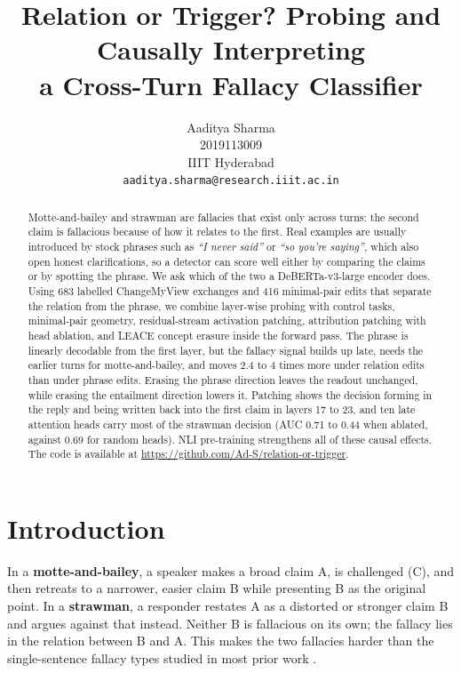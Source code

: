 \documentclass[11pt]{article}
\title{Relation or Trigger? Probing and Causally Interpreting\\a Cross-Turn Fallacy Classifier}
\author{Aaditya Sharma \\
  2019113009 \\
  IIIT Hyderabad \\
  \texttt{aaditya.sharma@research.iiit.ac.in}}
\begin{document}
\maketitle

\begin{abstract}
Motte-and-bailey and strawman are fallacies that exist only across turns: the second claim is fallacious because of how it relates to the first. Real examples are usually introduced by stock phrases such as \textit{``I never said''} or \textit{``so you're saying''}, which also open honest clarifications, so a detector can score well either by comparing the claims or by spotting the phrase. We ask which of the two a DeBERTa-v3-large encoder does. Using 683 labelled ChangeMyView exchanges and 416 minimal-pair edits that separate the relation from the phrase, we combine layer-wise probing with control tasks, minimal-pair geometry, residual-stream activation patching, attribution patching with head ablation, and LEACE concept erasure inside the forward pass. The phrase is linearly decodable from the first layer, but the fallacy signal builds up late, needs the earlier turns for motte-and-bailey, and moves 2.4 to 4 times more under relation edits than under phrase edits. Erasing the phrase direction leaves the readout unchanged, while erasing the entailment direction lowers it. Patching shows the decision forming in the reply and being written back into the first claim in layers 17 to 23, and ten late attention heads carry most of the strawman decision (AUC 0.71 to 0.44 when ablated, against 0.69 for random heads). NLI pre-training strengthens all of these causal effects. The code is available at \url{https://github.com/Ad-S/relation-or-trigger}.
\end{abstract}

\section{Introduction}

In a \textbf{motte-and-bailey}, a speaker makes a broad claim A, is challenged (C), and then retreats to a narrower, easier claim B while presenting B as the original point. In a \textbf{strawman}, a responder restates A as a distorted or stronger claim B and argues against that instead. Neither B is fallacious on its own; the fallacy lies in the relation between B and A. This makes the two fallacies harder than the single-sentence fallacy types studied in most prior work \citep{jin2022logical,habernal2018adhominem}.
\end{document}
